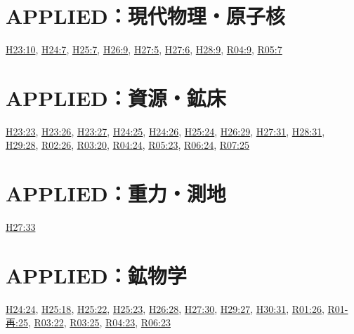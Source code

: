\section{APPLIED：現代物理・原子核}
\hyperref[q:h23-reg-applied-10]{H23:10}, \hyperref[q:h24-reg-applied-07]{H24:7}, \hyperref[q:h25-reg-applied-07]{H25:7}, \hyperref[q:h26-reg-applied-09]{H26:9}, \hyperref[q:h27-reg-applied-05]{H27:5}, \hyperref[q:h27-reg-applied-06]{H27:6}, \hyperref[q:h28-reg-applied-09]{H28:9}, \hyperref[q:r04-reg-applied-09]{R04:9}, \hyperref[q:r05-reg-applied-07]{R05:7}
\section{APPLIED：資源・鉱床}
\hyperref[q:h23-reg-applied-23]{H23:23}, \hyperref[q:h23-reg-applied-26]{H23:26}, \hyperref[q:h23-reg-applied-27]{H23:27}, \hyperref[q:h24-reg-applied-25]{H24:25}, \hyperref[q:h24-reg-applied-26]{H24:26}, \hyperref[q:h25-reg-applied-24]{H25:24}, \hyperref[q:h26-reg-applied-29]{H26:29}, \hyperref[q:h27-reg-applied-31]{H27:31}, \hyperref[q:h28-reg-applied-31]{H28:31}, \hyperref[q:h29-reg-applied-28]{H29:28}, \hyperref[q:r02-reg-applied-26]{R02:26}, \hyperref[q:r03-reg-applied-20]{R03:20}, \hyperref[q:r04-reg-applied-24]{R04:24}, \hyperref[q:r05-reg-applied-23]{R05:23}, \hyperref[q:r06-reg-applied-24]{R06:24}, \hyperref[q:r07-reg-applied-25]{R07:25}
\section{APPLIED：重力・測地}
\hyperref[q:h27-reg-applied-33]{H27:33}
\section{APPLIED：鉱物学}
\hyperref[q:h24-reg-applied-24]{H24:24}, \hyperref[q:h25-reg-applied-18]{H25:18}, \hyperref[q:h25-reg-applied-22]{H25:22}, \hyperref[q:h25-reg-applied-23]{H25:23}, \hyperref[q:h26-reg-applied-28]{H26:28}, \hyperref[q:h27-reg-applied-30]{H27:30}, \hyperref[q:h29-reg-applied-27]{H29:27}, \hyperref[q:h30-reg-applied-31]{H30:31}, \hyperref[q:r01-reg-applied-26]{R01:26}, \hyperref[q:r01-ret-applied-25]{R01-再:25}, \hyperref[q:r03-reg-applied-22]{R03:22}, \hyperref[q:r03-reg-applied-25]{R03:25}, \hyperref[q:r04-reg-applied-23]{R04:23}, \hyperref[q:r06-reg-applied-23]{R06:23}
